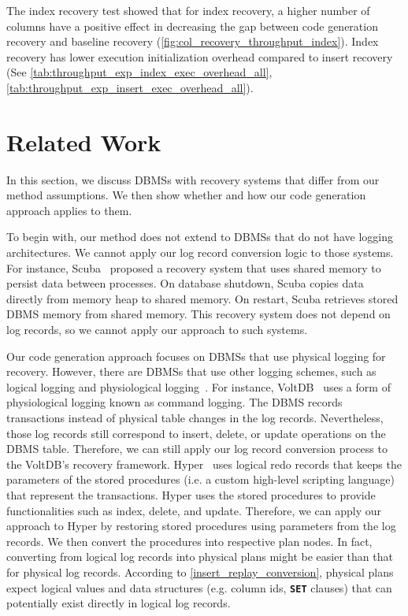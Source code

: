 \documentclass[12pt]{cmuthesis}
\newcommand{\dbSQL}[1]{\texttt{\textbf{#1}}\xspace}
\begin{document}
The index recovery test showed that for index recovery, a higher number of columns have a positive effect in decreasing the gap between code generation recovery and baseline recovery (\cref{fig:col_recovery_throughput_index}). Index recovery has lower execution initialization overhead compared to insert recovery (See \cref{tab:throughput_exp_index_exec_overhead_all}, \cref{tab:throughput_exp_insert_exec_overhead_all}).

\chapter{Related Work}
In this section, we discuss DBMSs with recovery systems that differ from our method assumptions. We then show whether and how our code generation approach applies to them.
\newline

To begin with, our method does not extend to DBMSs that do not have logging architectures. We cannot apply our log record conversion logic to those systems. For instance, Scuba~\cite{scuba14} proposed a recovery system that uses shared memory to persist data between processes. On database shutdown, Scuba copies data directly from memory heap to shared memory. On restart, Scuba retrieves stored DBMS memory from shared memory. This recovery system does not depend on log records, so we cannot apply our approach to such systems.
\newline

Our code generation approach focuses on DBMSs that use physical logging for recovery. However, there are DBMSs that use other logging schemes, such as logical logging and physiological logging~\cite{gray92}. For instance, VoltDB~\cite{malviya14} uses a form of physiological logging known as command logging. The DBMS records transactions instead of physical table changes in the log records. Nevertheless, those log records still correspond to insert, delete, or update operations on the DBMS table. Therefore, we can still apply our log record conversion process to the VoltDB's recovery framework. Hyper~\cite{kemper11} uses logical redo records that keeps the parameters of the stored procedures (i.e. a custom high-level scripting language) that represent the transactions. Hyper uses the stored procedures to provide functionalities such as index, delete, and update. Therefore, we can apply our approach to Hyper by restoring stored procedures using parameters from the log records. We then convert the procedures into respective plan nodes. In fact, converting from logical log records into physical plans might be easier than that for physical log records. According to \cref{insert_replay_conversion}, physical plans expect logical values and data structures (e.g. column ids, \dbSQL{SET} clauses) that can potentially exist directly in logical log records.
\newline
\end{document}
